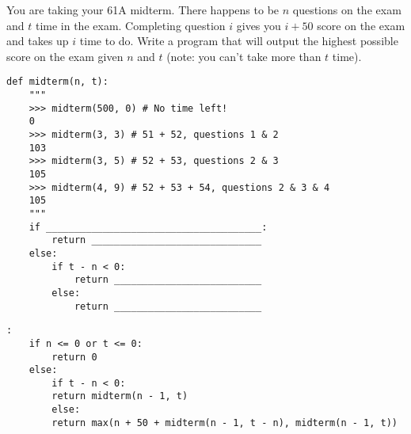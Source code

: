 \begin{blocksection}
\question You are taking your 61A midterm. There happens to be $n$ questions on the exam and $t$ time in the exam. Completing question $i$ gives you $i + 50$ score on the exam and takes up $i$ time to do. Write a program that will output the highest possible score on the exam given $n$ and $t$ (note: you can't take more than $t$ time). \\

\begin{lstlisting}
def midterm(n, t):
    """
    >>> midterm(500, 0) # No time left!
    0 
    >>> midterm(3, 3) # 51 + 52, questions 1 & 2
    103
    >>> midterm(3, 5) # 52 + 53, questions 2 & 3
    105 
    >>> midterm(4, 9) # 52 + 53 + 54, questions 2 & 3 & 4
    105
    """		
    if ______________________________________:		
        return ______________________________	
    else:
        if t - n < 0:	
            return __________________________	
        else:
            return __________________________
\end{lstlisting}

\begin{solution}[1in]
\begin{lstlisting}:
    if n <= 0 or t <= 0:
        return 0
    else:
        if t - n < 0:
	    return midterm(n - 1, t)
        else:
	    return max(n + 50 + midterm(n - 1, t - n), midterm(n - 1, t))
\end{lstlisting}
\end{solution}
\end{blocksection}
